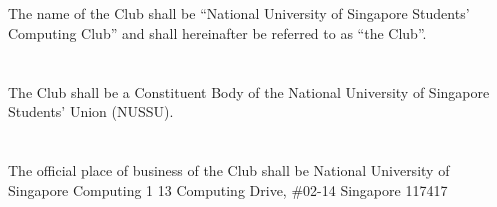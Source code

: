 
\section{}
The name of the Club shall be “National University of Singapore Students' Computing Club” and shall hereinafter be referred to as “the Club”.

\section{}
The Club shall be a Constituent Body of the National University of Singapore Students' Union (NUSSU).

\section{}
The official place of business of the Club shall be\newline
\hspace*{24mm}National University of Singapore\newline
\hspace*{24mm}Computing 1\newline
\hspace*{24mm}13 Computing Drive, \#02-14\newline
\hspace*{24mm}Singapore 117417

